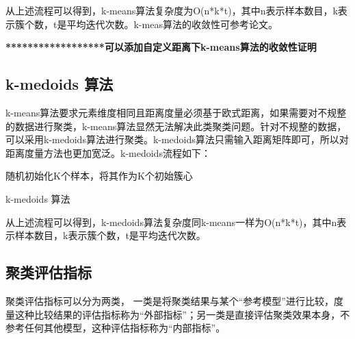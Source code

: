 从上述流程可以得到，k-means算法复杂度为O(n*k*t)，其中n表示样本数目，k表示簇个数，t是平均迭代次数。k-meas算法的收敛性可参考论文\cite{neal1998view}。


\textbf{******************可以添加自定义距离下k-means算法的收敛性证明}

\subsection{k-medoids 算法}
k-means算法要求元素维度相同且距离度量必须基于欧式距离，如果需要对不规整的数据进行聚类，k-means算法显然无法解决此类聚类问题。针对不规整的数据，可以采用k-medoids算法进行聚类。k-medoids算法只需输入距离矩阵即可，所以对距离度量方法也更加宽泛。k-medoids流程如下：\\
\begin{algorithm}[H]
	 随机初始化K个样本，将其作为K个初始簇心\;
	 \caption{k-medoids 算法}
\end{algorithm}

从上述流程可以得到，k-medoids算法复杂度同k-means一样为O(n*k*t)，其中n表示样本数目，k表示簇个数，t是平均迭代次数。


\subsection{聚类评估指标}
聚类评估指标可以分为两类，
一类是将聚类结果与某个“参考模型”进行比较，度量这种比较结果的评估指标称为“外部指标”；另一类是直接评估聚类效果本身，不参考任何其他模型，这种评估指标称为“内部指标”。

